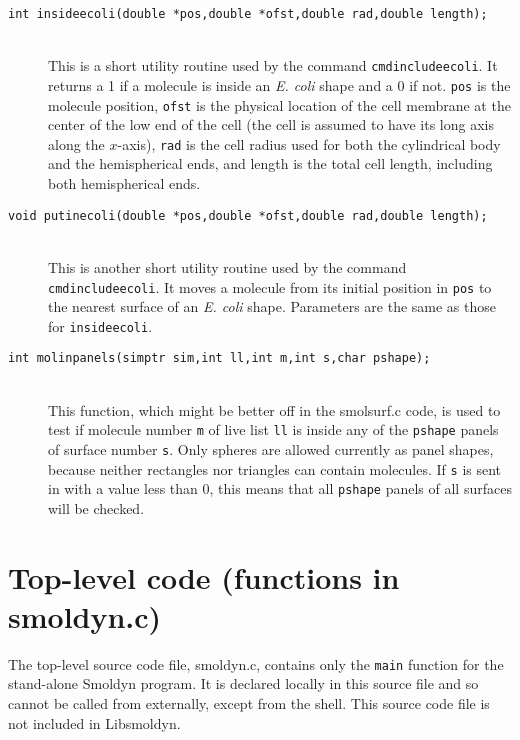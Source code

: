 \documentclass {book}
\begin{document}
\begin{description}
\item[\texttt{int insideecoli(double *pos,double *ofst,double rad,double length);}]
\hfill \\
This is a short utility routine used by the command \texttt{cmdincludeecoli}. It returns a 1 if a molecule is inside an \emph{E. coli} shape and a 0 if not. \texttt{pos} is the molecule position, \texttt{ofst} is the physical location of the cell membrane at the center of the low end of the cell (the cell is assumed to have its long axis along the $x$-axis), \texttt{rad} is the cell radius used for both the cylindrical body and the hemispherical ends, and length is the total cell length, including both hemispherical ends.

\item[\texttt{void putinecoli(double *pos,double *ofst,double rad,double length);}]
\hfill \\
This is another short utility routine used by the command \texttt{cmdincludeecoli}. It moves a molecule from its initial position in \texttt{pos} to the nearest surface of an \emph{E. coli} shape. Parameters are the same as those for \texttt{insideecoli}.

\item[\texttt{int molinpanels(simptr sim,int ll,int m,int s,char pshape);}]
\hfill \\
This function, which might be better off in the smolsurf.c code, is used to test if molecule number \texttt{m} of live list \texttt{ll} is inside any of the \texttt{pshape} panels of surface number \texttt{s}. Only spheres are allowed currently as panel shapes, because neither rectangles nor triangles can contain molecules. If \texttt{s} is sent in with a value less than 0, this means that all \texttt{pshape} panels of all surfaces will be checked.

\end{description}

\section{Top-level code (functions in smoldyn.c)}

The top-level source code file, smoldyn.c, contains only the \texttt{main} function for the stand-alone Smoldyn program. It is declared locally in this source file and so cannot be called from externally, except from the shell. This source code file is not included in Libsmoldyn.
\end{document}
